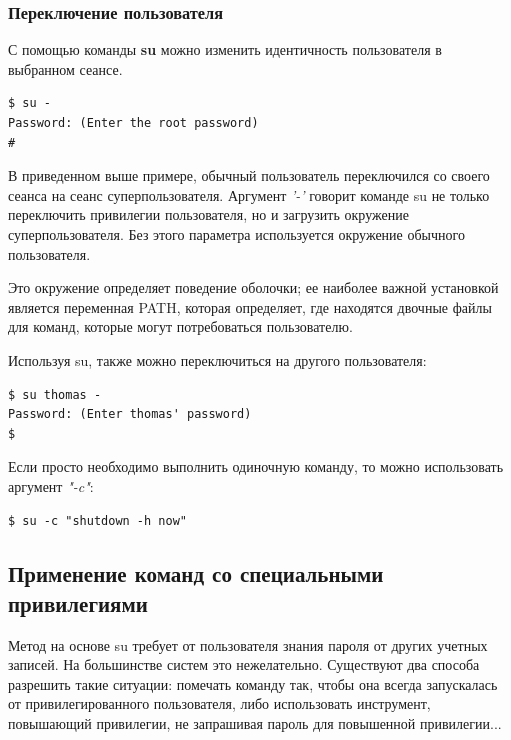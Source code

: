\documentclass[10pt]{book}
\begin{document}
\subsubsection{Переключение пользователя}
С помощью команды \textbf{su} можно изменить идентичность пользователя в выбранном сеансе.

\begin{tcolorbox}
\begin{lstlisting}
$ su -
Password: (Enter the root password)
#
\end{lstlisting}
\end{tcolorbox}

В приведенном выше примере, обычный пользователь переключился со своего сеанса на сеанс суперпользователя. Аргумент \textit{'-'} говорит команде su не только переключить привилегии пользователя, но и загрузить окружение суперпользователя. Без этого параметра используется окружение обычного пользователя.

Это окружение определяет поведение оболочки; ее наиболее важной установкой является переменная PATH, которая определяет, где находятся двочные файлы для команд, которые могут потребоваться пользователю. 

Используя su, также можно переключиться на другого пользователя:
\begin{tcolorbox}
\begin{lstlisting}
$ su thomas -
Password: (Enter thomas' password)
$
\end{lstlisting}
\end{tcolorbox}

Если просто необходимо выполнить одиночную команду, то можно использовать аргумент \textit{"-c"}:

\begin{tcolorbox}
\begin{lstlisting}
$ su -c "shutdown -h now"
\end{lstlisting}
\end{tcolorbox}

\subsection{Применение команд со специальными привилегиями}
Метод на основе su требует от пользователя знания пароля от других учетных записей. На большинстве систем это нежелательно. Существуют два способа разрешить такие ситуации: помечать команду так, чтобы она всегда запускалась от привилегированного пользователя, либо использовать инструмент, повышающий привилегии, не запрашивая пароль для повышенной привилегии...
\end{document}
